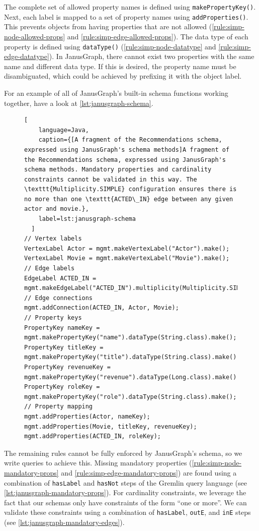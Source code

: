 \documentclass{report}
\theoremstyle{definition}
\begin{document}
The complete set of allowed property names is defined using \texttt{makePropertyKey()}. Next, each label is mapped to a set of property names using \texttt{addProperties()}. This prevents objects from having properties that are not allowed (\autoref{rule:simp-node-allowed-props} and \ref{rule:simp-edge-allowed-props}). The data type of each property is defined using \texttt{dataType()} (\autoref{rule:simp-node-datatype} and \ref{rule:simp-edge-datatype}). In JanusGraph, there cannot exist two properties with the same name and different data type. If this is desired, the property name must be disambiguated, which could be achieved by prefixing it with the object label.

For an example of all of JanusGraph's built-in schema functions working together, have a look at \autoref{lst:janusgraph-schema}.

\begin{figure}[H]
  \begin{lstlisting}[
    language=Java,
    caption={[A fragment of the Recommendations schema, expressed using JanusGraph's schema methods]A fragment of the Recommendations schema, expressed using JanusGraph's schema methods. Mandatory properties and cardinality constraints cannot be validated in this way. The \texttt{Multiplicity.SIMPLE} configuration ensures there is no more than one \texttt{ACTED\_IN} edge between any given actor and movie.},
    label=lst:janusgraph-schema
  ]
// Vertex labels
VertexLabel Actor = mgmt.makeVertexLabel("Actor").make();
VertexLabel Movie = mgmt.makeVertexLabel("Movie").make();
// Edge labels
EdgeLabel ACTED_IN = mgmt.makeEdgeLabel("ACTED_IN").multiplicity(Multiplicity.SIMPLE).make();
// Edge connections
mgmt.addConnection(ACTED_IN, Actor, Movie);
// Property keys
PropertyKey nameKey = mgmt.makePropertyKey("name").dataType(String.class).make();
PropertyKey titleKey = mgmt.makePropertyKey("title").dataType(String.class).make();
PropertyKey revenueKey = mgmt.makePropertyKey("revenue").dataType(Long.class).make();
PropertyKey roleKey = mgmt.makePropertyKey("role").dataType(String.class).make();
// Property mapping
mgmt.addProperties(Actor, nameKey);
mgmt.addProperties(Movie, titleKey, revenueKey);
mgmt.addProperties(ACTED_IN, roleKey);
  \end{lstlisting}
\end{figure}

The remaining rules cannot be fully enforced by JanusGraph's schema, so we write queries to achieve this. Missing mandatory properties (\autoref{rule:simp-node-mandatory-props} and \ref{rule:simp-edge-mandatory-props}) are found using a combination of \texttt{hasLabel} and \texttt{hasNot} steps of the Gremlin query language (see \autoref{lst:janusgraph-mandatory-props}). For cardinality constraints, we leverage the fact that our schemas only have constraints of the form ``one or more''. We can validate these constraints using a combination of \texttt{hasLabel}, \texttt{outE}, and \texttt{inE} steps (see \autoref{lst:janusgraph-mandatory-edges}).
\end{document}
